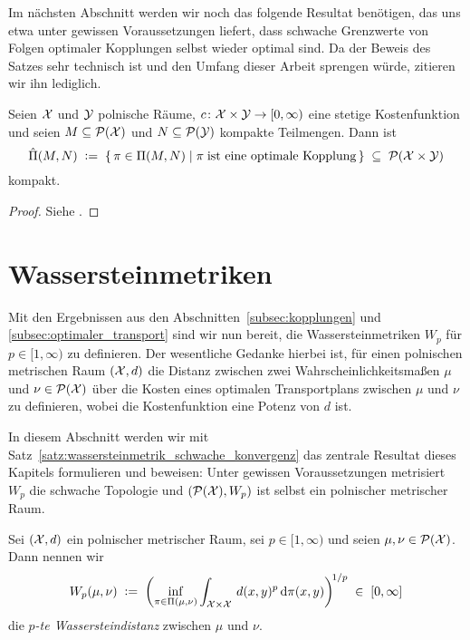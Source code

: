 \documentclass[../thesis/thesis.tex]{subfiles}
\begin{document}
	Im nächsten Abschnitt werden wir noch das folgende Resultat benötigen, das uns etwa unter gewissen Voraussetzungen liefert, dass schwache Grenzwerte von Folgen optimaler Kopplungen selbst wieder optimal sind. Da der Beweis des Satzes sehr technisch ist und den Umfang dieser Arbeit sprengen würde, zitieren wir ihn lediglich.

	\begin{Satz}
		\label{satz:optimale_transportpläne_kompakt}
		Seien $\mathcal{X}$ und $\mathcal{Y}$ polnische Räume, $c \colon \mathcal{X} \times \mathcal{Y} \to [0, \infty)$ eine stetige Kostenfunktion und seien $M \subseteq \mathcal{P}(\mathcal{X})$ und $N \subseteq \mathcal{P}(\mathcal{Y})$ kompakte Teilmengen.
		Dann ist 
		\[ \hat{\Pi}(M, N) \; \vcentcolon = \; \left\{\, \pi \in \Pi(M, N) \; \middle| \; \pi \; \text{ist eine optimale Kopplung} \,\right\} \; \subseteq \; \mathcal{P}(\mathcal{X} \times \mathcal{Y}) \]
		kompakt.
	\end{Satz}

	\begin{proof}
		Siehe \cite[Corollary 5.21]{Villani.2009}.
	\end{proof}

	\section{Wassersteinmetriken}
	\label{subsec:wassersteinmetriken}
	
	Mit den Ergebnissen aus den Abschnitten~\ref{subsec:kopplungen} und \ref{subsec:optimaler_transport} sind wir nun bereit, die Wassersteinmetriken $W_p$ für $p \in [1, \infty)$ zu definieren. Der wesentliche Gedanke hierbei ist,
	für einen polnischen metrischen Raum $(\mathcal{X}, d)$ die Distanz zwischen zwei Wahrscheinlichkeitsmaßen $\mu$ und $\nu \in \mathcal{P}(\mathcal{X})$ über die Kosten eines optimalen Transportplans zwischen $\mu$ und
	$\nu$ zu definieren, wobei die Kostenfunktion eine Potenz von $d$ ist.
	
	In diesem Abschnitt werden wir mit Satz~\ref{satz:wassersteinmetrik_schwache_konvergenz} das zentrale Resultat dieses Kapitels formulieren und beweisen: Unter gewissen Voraussetzungen metrisiert $W_p$ die schwache Topologie und $(\mathcal{P}(\mathcal{X}), W_p)$ ist selbst ein polnischer metrischer Raum.

	\begin{Definition}
		\label{def:wassersteinmetrik}
		Sei $(\mathcal{X}, d)$ ein polnischer metrischer Raum, sei $p \in [1, \infty)$ und seien $\mu, \nu \in \mathcal{P}(\mathcal{X})$. Dann nennen wir
		$$ W_p(\mu, \nu) \; \vcentcolon = \; \left(\inf_{\pi \in \Pi(\mu, \nu)} \int_{\mathcal{X} \times \mathcal{X}} \, d(x, y)^p \, \mathrm{d}\pi(x, y)\right)^{\! 1/p} \; \in \; [0, \infty] $$
		die \emph{$p$-te Wassersteindistanz} zwischen $\mu$ und $\nu$.
	\end{Definition}
\end{document}
